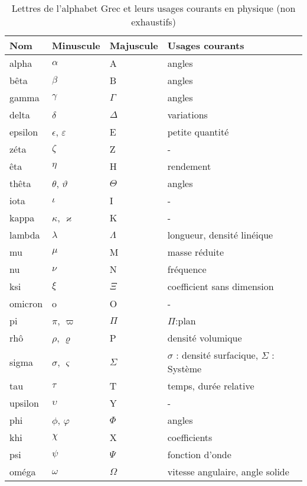 \begin{table}[!h]
    \begin{tabular}{@{}P{1.75cm}P{1.75cm}P{1.75cm}P{4.75cm}@{}}
    \toprule
    Nom & Minuscule & Majuscule & Usages courants \\
    \midrule
    alpha & $\alpha$ & A  & angles \\
    bêta  & $\beta$  & B  & angles \\
    gamma & $\gamma$ & $\Gamma$ & angles \\
    delta & $\delta$ & $\Delta$ & variations \\
    epsilon & $\epsilon$, $\varepsilon$ & E & petite quantité \\
    zéta & $\zeta$ & Z & -  \\
    êta & $\eta$ & H & rendement \\
    thêta & $\theta$, $\vartheta$  & $\Theta$ & angles \\
    iota & $\iota$ & I & - \\
    kappa & $\kappa$, $\varkappa$ & K & - \\
    lambda & $\lambda$ & $\Lambda$ & longueur, densité linéique \\
    mu & $\mu$ & M & masse réduite \\
    nu & $\nu$ & N & fréquence \\
    ksi & $\xi$ & $\Xi$ & coefficient sans dimension \\
    omicron & o & O & - \\
    pi & $\pi$, $\varpi$ & $\Pi$ & $\Pi$:plan \\
    rhô & $\rho$, $\varrho$ & P & densité volumique \\
    sigma & $\sigma$, 
          $\varsigma$ & $\Sigma$ & $\sigma$ : densité surfacique, 
                                     $\Sigma$ : Système  \\
    tau & $\tau$ & T & temps, durée relative  \\
    upsilon & $\upsilon$ & Y & -  \\
    phi & $\phi$, $\varphi$ & $\Phi$ & angles   \\
    khi & $\chi$ & X  & coefficients   \\
    psi & $\psi$ & $\Psi$ & fonction d'onde   \\
    oméga & $\omega$ & $\Omega$ & vitesse angulaire, angle solide   \\
    \bottomrule
    \end{tabular}
    \caption{Lettres de l'alphabet Grec et leurs usages courants 
             en physique (non exhaustifs)}
\end{table}
